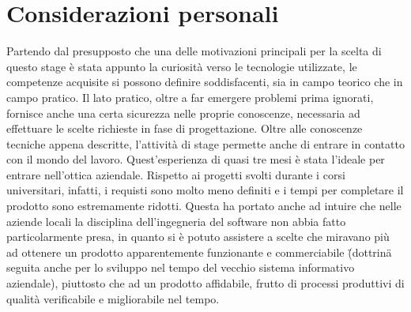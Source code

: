 \section{Considerazioni personali}
Partendo dal presupposto che una delle motivazioni principali per la scelta di questo stage \`e stata appunto la curiosit\`a verso le tecnologie utilizzate, le competenze acquisite si possono definire soddisfacenti, sia in campo teorico che in campo pratico. Il lato pratico, oltre a far emergere problemi prima ignorati, fornisce anche una certa sicurezza nelle proprie conoscenze, necessaria ad effettuare le scelte richieste in fase di progettazione. Oltre alle conoscenze tecniche appena descritte, l'attivit\`a di stage permette anche di entrare in contatto con il mondo del lavoro. Quest'esperienza di quasi tre mesi \`e stata l'ideale per entrare nell'ottica aziendale. Rispetto ai progetti svolti durante i corsi universitari, infatti, i requisti sono molto meno definiti e i tempi per completare il prodotto sono estremamente ridotti. Questa ha portato anche ad intuire che nelle aziende locali la disciplina dell'ingegneria del software non abbia fatto particolarmente presa, in quanto si \`e potuto assistere a scelte che miravano pi\`u ad ottenere un prodotto apparentemente funzionante e commerciabile (\"{}dottrina\"{} seguita anche per lo sviluppo nel tempo del vecchio sistema informativo aziendale), piuttosto che ad un prodotto affidabile, frutto di processi produttivi di qualit\`a verificabile e migliorabile nel tempo.

